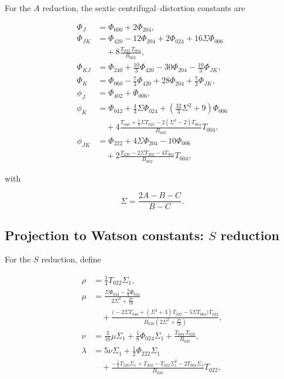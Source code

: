 \documentclass[aip,jcp,reprint,floatfix]{revtex4-2}
\begin{document}
For the $A$ reduction, the sextic centrifugal–distortion constants are

\begin{align}
\Phi_J &= \Phi_{600}+2\Phi_{204},\\
\Phi_{JK} &=
\Phi_{420}-12\Phi_{204}+2\Phi_{024}
+16\Sigma\Phi_{006} \\
&\quad +8\frac{T_{022}\,T_{004}}{B_{002}},\\
\Phi_{KJ} &= \Phi_{240}+\frac{10}{3}\Phi_{420}
-30\Phi_{204}-\frac{10}{3}\Phi_{JK},\\
\Phi_K &= \Phi_{060}-\frac{7}{3}\Phi_{420}
+28\Phi_{204}+\frac{7}{3}\Phi_{JK},\\
\phi_J &= \Phi_{402}+\Phi_{006},\\
\phi_K &=
\Phi_{042}+\frac{4}{3}\Sigma\Phi_{024}
+\left(\frac{32}{3}\Sigma^2+9\right)\Phi_{006} \\
&\quad +4\frac{T_{040}+\frac{1}{3}\Sigma T_{022}
-2(\Sigma^2-2)T_{004}}{B_{002}}T_{004},\\
\phi_{JK} &=
\Phi_{222}+4\Sigma\Phi_{204}-10\Phi_{006} \\
&\quad +2\frac{T_{220}-2\Sigma T_{202}-4T_{004}}{B_{002}}T_{004},
\end{align}

with

\begin{equation}
\Sigma=\frac{2A-B-C}{B-C}.
\end{equation}

\subsection{Projection to Watson constants: $S$ reduction}

For the $S$ reduction, define

\begin{align}
\rho &= \frac{1}{4}T_{022}\Sigma_1,\\
\mu &=
\frac{\Sigma\Phi_{042}-\frac{9}{8}\Phi_{024}}%
{2\Sigma^2+\frac{27}{16}} \\
&\quad +\frac{\bigl(-2\Sigma T_{040}+(\Sigma^2+3)T_{022}
-5\Sigma T_{004}\bigr)T_{022}}%
{B_{020}\left(2\Sigma^2+\frac{27}{16}\right)},\\
\nu &= \frac{3}{16}\mu\Sigma_1+\frac{1}{8}\Phi_{024}\Sigma_1
+\frac{T_{004}\,T_{022}}{B_{020}},\\
\lambda &=
5\nu\Sigma_1+\frac{1}{2}\Phi_{222}\Sigma_1 \\
&\quad +\frac{-\frac{1}{2}T_{220}\Sigma_1+T_{202}
-T_{022}\Sigma_1^2-2T_{004}\Sigma_1}{B_{020}}T_{022},
\end{align}
\end{document}
